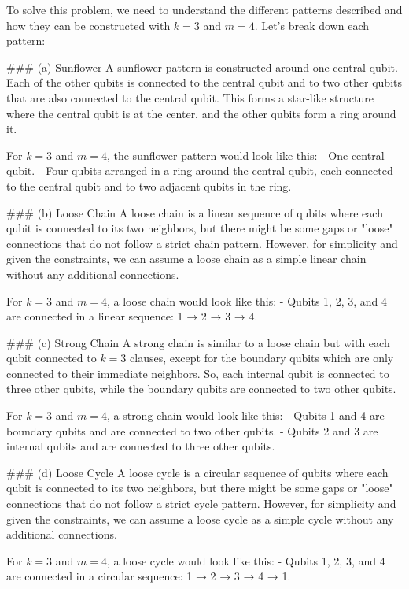 To solve this problem, we need to understand the different patterns described and how they can be constructed with \( k = 3 \) and \( m = 4 \). Let's break down each pattern:

### (a) Sunflower
A sunflower pattern is constructed around one central qubit. Each of the other qubits is connected to the central qubit and to two other qubits that are also connected to the central qubit. This forms a star-like structure where the central qubit is at the center, and the other qubits form a ring around it.

For \( k = 3 \) and \( m = 4 \), the sunflower pattern would look like this:
- One central qubit.
- Four qubits arranged in a ring around the central qubit, each connected to the central qubit and to two adjacent qubits in the ring.

### (b) Loose Chain
A loose chain is a linear sequence of qubits where each qubit is connected to its two neighbors, but there might be some gaps or "loose" connections that do not follow a strict chain pattern. However, for simplicity and given the constraints, we can assume a loose chain as a simple linear chain without any additional connections.

For \( k = 3 \) and \( m = 4 \), a loose chain would look like this:
- Qubits 1, 2, 3, and 4 are connected in a linear sequence: 1 → 2 → 3 → 4.

### (c) Strong Chain
A strong chain is similar to a loose chain but with each qubit connected to \( k = 3 \) clauses, except for the boundary qubits which are only connected to their immediate neighbors. So, each internal qubit is connected to three other qubits, while the boundary qubits are connected to two other qubits.

For \( k = 3 \) and \( m = 4 \), a strong chain would look like this:
- Qubits 1 and 4 are boundary qubits and are connected to two other qubits.
- Qubits 2 and 3 are internal qubits and are connected to three other qubits.

### (d) Loose Cycle
A loose cycle is a circular sequence of qubits where each qubit is connected to its two neighbors, but there might be some gaps or "loose" connections that do not follow a strict cycle pattern. However, for simplicity and given the constraints, we can assume a loose cycle as a simple cycle without any additional connections.

For \( k = 3 \) and \( m = 4 \), a loose cycle would look like this:
- Qubits 1, 2, 3, and 4 are connected in a circular sequence: 1 → 2 → 3 → 4 → 1.

